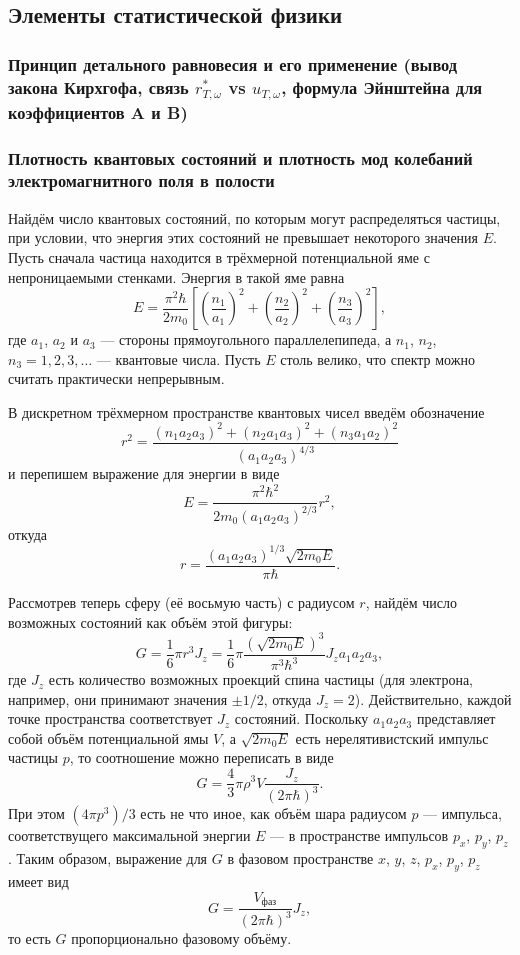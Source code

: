 \subsection{Элементы статистической физики}
\subsubsection{Принцип детального равновесия и его применение (вывод закона Кирхгофа, связь $r_{T, \omega}^*$ vs $u_{T, \omega}$, формула Эйнштейна для коэффициентов A и B)}


\subsubsection{Плотность квантовых состояний и плотность мод колебаний электромагнитного поля в полости}
Найдём число квантовых состояний, по которым могут распределяться частицы, при
условии, что энергия этих состояний не превышает некоторого значения $ E $.
Пусть сначала частица находится в трёхмерной потенциальной яме с непроницаемыми
стенками. Энергия в такой яме равна 
\[
  E = \frac{\pi^2\hbar}{2m_0} \left[ \left( \frac{n_1}{a_1} \right)^2 + \left(
  \frac{n_2}{a_2}\right)^2 + \left( \frac{n_3}{a_3} \right)^2   \right],
\]
где $ a_1 $, $ a_2 $ и $ a_3 $ --- стороны прямоугольного параллелепипеда, а $
n_1 $, $ n_2 $, $ n_3 = 1, 2, 3,\ldots$ --- квантовые числа. Пусть $ E $ столь
велико, что спектр можно считать практически непрерывным.

В дискретном трёхмерном пространстве квантовых чисел введём обозначение  
\[
  r^2 = \frac{(n_1a_2a_3)^2 + (n_2a_1a_3)^2 + (n_3a_1a_2)^2}{(a_1a_2a_3)^{4/3}}
\]
и перепишем выражение для энергии в виде 
\[
  E = \frac{\pi^2\hbar^2}{2m_0(a_1a_2a_3)^{2/3}}r^2,
\]
откуда 
\[
  r = \frac{(a_1a_2a_3)^{1/3}\sqrt{2m_0E}}{\pi\hbar}.
\]

Рассмотрев теперь сферу (её восьмую часть) с радиусом $ r $, найдём число
возможных состояний как объём этой фигуры:
\[
  G = \frac{1}{6}\pi r^3 J_z = \frac{1}{6} \pi \frac{ \left( \sqrt{2m_0E}
  \right)^3 }{\pi^3\hbar^3}J_z a_1a_2a_3,
\]
где $ J_z $ есть количество возможных проекций спина частицы (для электрона,
например, они принимают значения $ \pm 1/2 $, откуда $ J_z = 2 $).
Действительно, каждой точке пространства соответствует $ J_z $ состояний.
Поскольку $ a_1a_2a_3 $ представляет собой объём потенциальной ямы $ V $, а $
\sqrt{2m_0E} $ есть нерелятивистский импульс частицы $ p $, то соотношение можно
переписать в виде 
\[
  G = \frac{4}{3} \pi \rho^3 V \frac{J_z}{(2\pi\hbar)^3}.
\]
При этом $ (4\pi p^3)/3 $ есть не что иное, как объём шара радиусом $ p $
--- импульса, соответствущего максимальной энергии $ E $ --- в пространстве
импульсов $ p_x $, $ p_y $, $ p_z $. Таким образом, выражение для $ G $ в
фазовом пространстве $ x $, $ y $, $ z $, $ p_x $, $ p_y $, $ p_z $ имеет вид 
\[
  G = \frac{V_{\text{фаз}}}{(2\pi \hbar)^3} J_z,
\]
то есть $ G $ пропорционально фазовому объёму.

